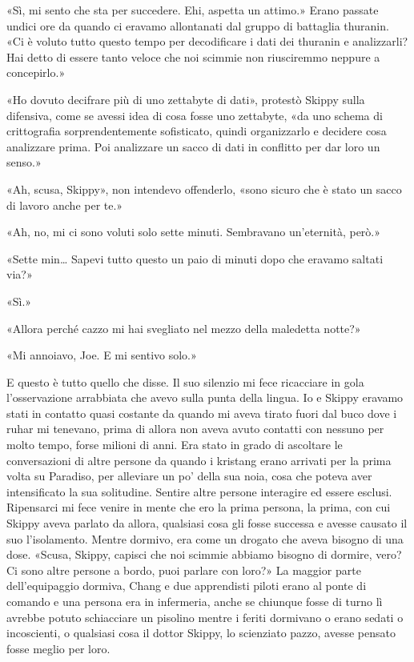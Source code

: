 «Sì, mi sento che sta per succedere. Ehi, aspetta un attimo.» Erano
passate undici ore da quando ci eravamo allontanati dal gruppo di
battaglia thuranin. «Ci è voluto tutto questo tempo per decodificare i
dati dei thuranin e analizzarli? Hai detto di essere tanto veloce che
noi scimmie non riusciremmo neppure a concepirlo.»

«Ho dovuto decifrare più di uno zettabyte di dati», protestò Skippy
sulla difensiva, come se avessi idea di cosa fosse uno zettabyte, «da
uno schema di crittografia sorprendentemente sofisticato, quindi
organizzarlo e decidere cosa analizzare prima. Poi analizzare un sacco
di dati in conflitto per dar loro un senso.»

«Ah, scusa, Skippy», non intendevo offenderlo, «sono sicuro che è stato
un sacco di lavoro anche per te.»

«Ah, no, mi ci sono voluti solo sette minuti. Sembravano un'eternità,
però.»

«Sette min\ldots{} Sapevi tutto questo un paio di minuti dopo che
eravamo saltati via?»

«Sì.»

«Allora perché cazzo mi hai svegliato nel mezzo della maledetta notte?»

«Mi annoiavo, Joe. E mi sentivo solo.»

E questo è tutto quello che disse. Il suo silenzio mi fece ricacciare in
gola l'osservazione arrabbiata che avevo sulla punta della lingua. Io e
Skippy eravamo stati in contatto quasi costante da quando mi aveva
tirato fuori dal buco dove i ruhar mi tenevano, prima di allora non
aveva avuto contatti con nessuno per molto tempo, forse milioni di anni.
Era stato in grado di ascoltare le conversazioni di altre persone da
quando i kristang erano arrivati per la prima volta su Paradiso, per
alleviare un po' della sua noia, cosa che poteva aver intensificato la
sua solitudine. Sentire altre persone interagire ed essere esclusi.
Ripensarci mi fece venire in mente che ero la prima persona, la prima,
con cui Skippy aveva parlato da allora, qualsiasi cosa gli fosse
successa e avesse causato il suo l'isolamento. Mentre dormivo, era come
un drogato che aveva bisogno di una dose. «Scusa, Skippy, capisci che
noi scimmie abbiamo bisogno di dormire, vero? Ci sono altre persone a
bordo, puoi parlare con loro?» La maggior parte dell'equipaggio dormiva,
Chang e due apprendisti piloti erano al ponte di comando e una persona
era in infermeria, anche se chiunque fosse di turno lì avrebbe potuto
schiacciare un pisolino mentre i feriti dormivano o erano sedati o
incoscienti, o qualsiasi cosa il dottor Skippy, lo scienziato pazzo,
avesse pensato fosse meglio per loro.

